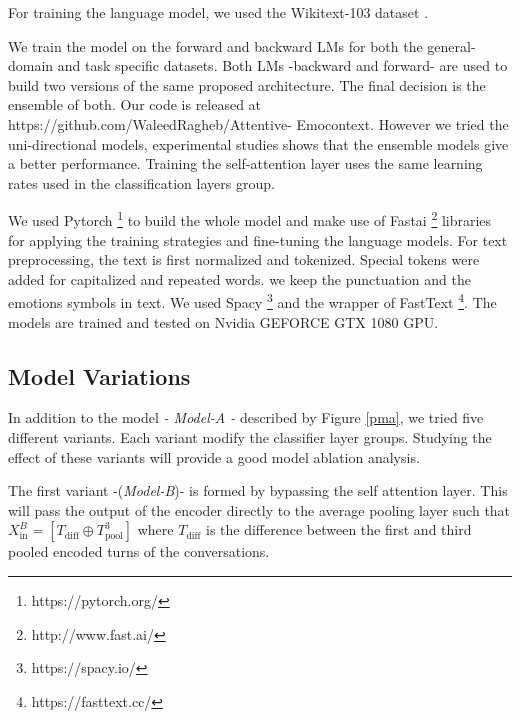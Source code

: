 \documentclass{article}
\begin{document}
For training the language model, we used the Wikitext-103 dataset \cite{wiki}.
\begin{comment}With more than 28K of Wikipedia articles and 103 million words, the model determine the main structure and hierarchy of the language by sequence-to-sequence modeling. The training of the architecture is done using  slanted triangular learning rates (STLR) which change the learning rate for each iteration in triangular fashion. we used only once cycle as recommend in \cite{jerm}. The model was trained by discriminative fine-tuning which uses different learning rate for each layer group. The model is trained gradually by freezing and unfreezing layers for different groups. 
\end{comment}
We train the model on the forward and backward LMs for both the general-domain and task specific datasets. Both LMs -backward and forward- are used to build two versions of the same proposed architecture. The final decision is the ensemble of both.  Our code is released at https://github.com/WaleedRagheb/Attentive- Emocontext. However we tried the uni-directional models, experimental studies shows that the ensemble models give a better performance. Training the self-attention layer uses the same learning rates used in the classification layers group.

 We used Pytorch \footnote{https://pytorch.org/} to build the whole model and make use of Fastai  \footnote{http://www.fast.ai/} libraries for applying the training strategies and fine-tuning the language models. For text preprocessing, the text is first normalized and tokenized. Special tokens were added for capitalized and repeated words. we keep the punctuation and the emotions symbols in text. We used Spacy \footnote{https://spacy.io/} and the wrapper of FastText \footnote{https://fasttext.cc/}. The models are trained and tested on Nvidia GEFORCE GTX 1080 GPU. 


\subsection{Model Variations}
In addition to the model  \textit{- Model-A -}   described by Figure \ref{pma}, we tried five different variants. Each variant modify the classifier layer groups. Studying the effect of these variants will provide a good model ablation analysis. 


The first variant -(\textit{Model-B})- is formed by bypassing the self attention layer. This will pass the output of the encoder directly to the average pooling layer such that $X_{\text{in}}^B = [T_{\text{diff}} \oplus T_{\text{pool}}^3]$ where $T_{\text{diff}}$ is the difference between the first and third pooled encoded turns of the conversations. 
\end{document}

